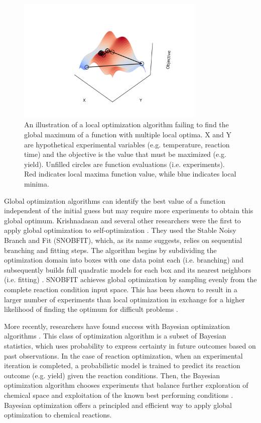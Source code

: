 \begin{figure}
    \centering
    \includegraphics[width=0.8\textwidth]{gfx/Chapter03/local_optimzation.png}
    \caption{An illustration of a local optimization algorithm failing to find the global maximum of a function with multiple local optima. X and Y are hypothetical experimental variables (e.g. temperature, reaction time) and the objective is the value that must be maximized (e.g. yield). Unfilled circles are function evaluations (i.e. experiments). Red indicates local maxima function value, while blue indicates local minima.}
    \label{fig:local-optimization}
\end{figure}
 
Global optimization algorithms can identify the best value of a function independent of the initial guess but may require more experiments to obtain this global optimum. Krishnadasan and several other researchers were the first to apply global optimization to self-optimization \cite{Holmes2016b, Krishnadasan2007, McMullen2010a}. They used the Stable Noisy Branch and Fit (SNOBFIT), which, as its name suggests, relies on sequential branching and fitting steps. The algorithm begins by subdividing the optimization domain into boxes with one data point each (i.e. branching) and subsequently builds full quadratic models for each box and its nearest neighbors (i.e. fitting) \cite{Huyer2008}. SNOBFIT achieves global optimization by sampling evenly from the complete reaction condition input space. This has been shown to result in a larger number of experiments than local optimization in exchange for a higher likelihood of finding the optimum for difficult problems \cite{McMullen2010a}.

More recently, researchers have found success with Bayesian optimization algorithms \cite{Schweidtmann2018, Amar2019, Hase2020, Shields2021, Manson2021}. This class of optimization algorithm is a subset of Bayesian statistics, which uses probability to express certainty in future outcomes based on past observations. In the case of reaction optimization, when an experimental iteration is completed, a probabilistic model is trained to predict its reaction outcome (e.g. yield) given the reaction conditions. Then, the Bayesian optimization algorithm chooses experiments that balance further exploration of chemical space and exploitation of the known best performing conditions \cite{Shahriari2016}. Bayesian optimization offers a principled and efficient way to apply global optimization to chemical reactions. 

